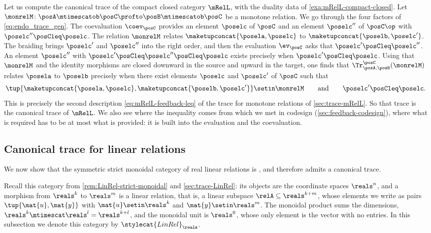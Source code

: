 \begin{example}
    \label{exa:mRelL-canonical-trace}
    Let us compute the canonical trace of the compact closed category $\mRelL$, with the duality data of \cref{exa:mRelL-compact-closed}.
    Let $\monrelM \colon \posA \mtimescatob \posC \profto \posB \mtimescatob \posC$ be a monotone relation.
    We go through the four factors of \cref{eq:endo_trace_gen}.
    The coevaluation $\coev_{\posC}$ provides an element $\poselc$ of $\posC$ and an element $\poselc''$ of $\posC\op$ with $\poselc'' \posCleq \poselc$.
    The relation $\monrelM$ relates $\maketupconcat{\posela, \poselc}$ to $\maketupconcat{\poselb, \poselc'}$.
    The braiding brings $\poselc'$ and $\poselc''$ into the right order, and then the evaluation $\ev_{\posC}$ asks that $\poselc' \posCleq \poselc''$.
    An element $\poselc''$ with $\poselc' \posCleq \poselc'' \posCleq \poselc$ exists precisely when $\poselc' \posCleq \poselc$.
    Using that $\monrelM$ and the identity morphisms are closed downward in the source and upward in the target, one finds that $\Tr_{\posA,\posB}^{\posC}(\monrelM)$ relates $\posela$ to $\poselb$ precisely when there exist elements $\poselc$ and $\poselc'$ of $\posC$ such that
    \begin{equation}
        \tup{\maketupconcat{\posela, \poselc}, \maketupconcat{\poselb, \poselc'}} \setin \monrelM
        \qquad \text{and} \qquad
        \poselc' \posCleq \poselc.
    \end{equation}
    This is precisely the second description \cref{eq:mRelL-feedback-leq} of the trace for monotone relations of \cref{sec:trace-mRelL}.
    So that trace is the canonical trace of $\mRelL$.
    We also see where the inequality comes from which we met in codesign (\cref{sec:feedback-codesign}), where what is required has to be at most what is provided: it is built into the evaluation and the coevaluation.
\end{example}

\subsection{Canonical trace for linear relations}

We now show that the symmetric strict monoidal category of real linear relations is , and therefore admits a canonical trace.

Recall this category from \cref{rem:LinRel-strict-monoidal} and \cref{sec:trace-LinRel}: its objects are the coordinate spaces $\reals^n$, and a morphism from $\reals^k$ to $\reals^m$ is a linear relation, that is, a linear subspace $\relA \subseteq \reals^{k+m}$, whose elements we write as pairs $\tup{\mat{u}, \mat{y}}$ with $\mat{u} \setin \reals^k$ and $\mat{y} \setin \reals^m$.
The monoidal product sums the dimensions, $\reals^k \mtimescat \reals^l = \reals^{k+l}$, and the monoidal unit is $\reals^0$, whose only element is the vector with no entries.
In this subsection we denote this category by $\stylecat{LinRel}_\reals$.

